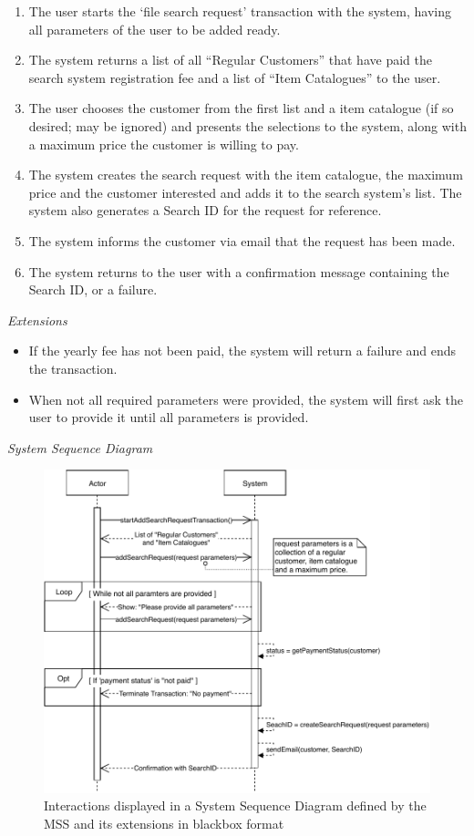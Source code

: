 \begin{enumerate}[noitemsep]
	\item The user starts the `file search request' transaction with the system, having all parameters of the user to be added ready.
	\item The system returns a list of all ``Regular Customers'' that have paid the search system registration fee and a list of ``Item Catalogues'' to the user.
	\item The user chooses the customer from the first list and a item catalogue (if so desired; may be ignored) and presents the selections to the system, along with a maximum price the customer is willing to pay.
	\item The system creates the search request with the item catalogue, the maximum price and the customer interested and adds it to the search system's list. The system also generates a Search ID for the request for reference.
	\item The system informs the customer via email that the request has been made.
	\item The system returns to the user with a confirmation message containing the Search ID, or a failure.
\end{enumerate}
\textsl{Extensions}
\begin{itemize}[noitemsep]
	\item If the yearly fee has not been paid, the system will return a failure and ends the transaction.
	\item When not all required parameters were provided, the system will first ask the user to provide it until all parameters is provided.
\end{itemize}
\textsl{System Sequence Diagram}
\begin{figure}[H]
	\centering
	\includegraphics[scale=1]{uml/SD-bb-createsearch.pdf}
	\caption*{Interactions displayed in a System Sequence Diagram defined by the MSS and its extensions in blackbox format}
\end{figure}
